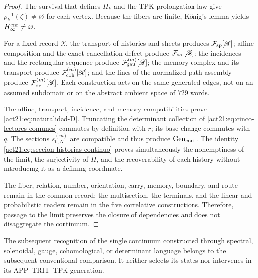 \begin{proof}
The survival that defines \(H_k\) and the TPK prolongation law give
\(\rho_k^{-1}(\zeta)\neq\varnothing\) for each vertex. Because the fibers are
finite, Kőnig's lemma yields \(H_\infty^{\rm enr}\neq\varnothing\).

For a fixed record \(\mathscr R\), the transport of histories and sheets produces
\(\mathcal F_{\rm sp}[\mathscr R]\); affine composition and the exact
cancellation defect produce \(\mathcal F_{\rm sol}[\mathscr R]\); the incidences
and the rectangular sequence produce \(\mathcal F_{\rm gau}^{(m)}[\mathscr R]\);
the memory complex and its transport produce
\(\mathcal F_{\rm coh}^{(m)}[\mathscr R]\); and the lines of the normalized
path assembly produce \(\mathcal F_{\rm det}^{(m)}[\mathscr R]\).
Each construction acts on the same generated edges, not on an
assumed subdomain or on the abstract ambient space of \(729\) words.

The affine, transport, incidence, and memory compatibilities prove
\eqref{act21:eq:naturalidad-D}. Truncating the determinant collection of
\eqref{act21:eq:cinco-lectores-comunes} commutes by
definition with \(r\); its base change commutes with \(q\). The sections
\(s_{0,N}^{(m)}\) are compatible and thus produce
\(\operatorname{Gen}_{\rm cont}\). The identity
\eqref{act21:eq:seccion-historias-continuo} proves simultaneously the
nonemptiness of the limit, the surjectivity of \(\Pi\), and the recoverability of each
history without introducing it as a defining coordinate.

The fiber, relation, number, orientation, carry, memory,
boundary, and route remain in the common record; the multisection, the
terminals, and the linear and probabilistic readers remain in the five
correlative constructions. Therefore, passage to the limit preserves the closure of
dependencies and does not disaggregate the continuum.
\end{proof}

The subsequent recognition of the single continuum constructed through
spectral, solenoidal, gauge, cohomological, or determinant language belongs to the
subsequent conventional comparison. It neither selects its states nor intervenes in
its APP--TRIT--TPK generation.

